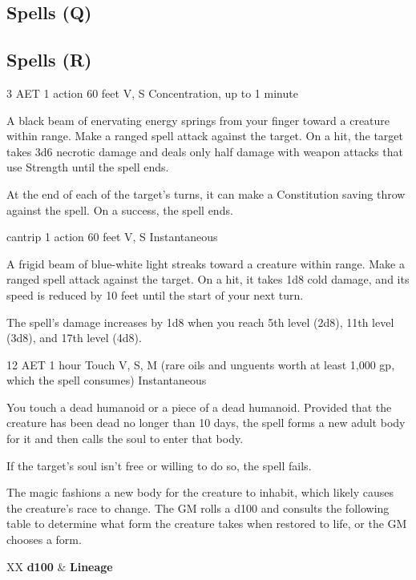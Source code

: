\subsection{Spells (Q)}

\subsection{Spells (R)}

{3 AET}
{1 action}
{60 feet}
{V, S}
{Concentration, up to 1 minute}

A black beam of enervating energy springs from your finger toward a creature within range. Make a ranged spell attack against the target. On a hit, the target takes 3d6 necrotic damage and deals only half damage with weapon attacks that use Strength until the spell ends.

At the end of each of the target's turns, it can make a Constitution saving throw against the spell. On a success, the spell ends.

{cantrip}
{1 action}
{60 feet}
{V, S}
{Instantaneous}

A frigid beam of blue-white light streaks toward a creature within range. Make a ranged spell attack against the target. On a hit, it takes 1d8 cold damage, and its speed is reduced by 10 feet until the start of your next turn.

The spell's damage increases by 1d8 when you reach 5th level (2d8), 11th level (3d8), and 17th level (4d8).

{12 AET}
{1 hour}
{Touch}
{V, S, M (rare oils and unguents worth at least 1,000 gp, which the spell consumes)}
{Instantaneous}

You touch a dead humanoid or a piece of a dead humanoid. Provided that the creature has been dead no longer than 10 days, the spell forms a new adult body for it and then calls the soul to enter that body.

If the target's soul isn't free or willing to do so, the spell fails.

The magic fashions a new body for the creature to inhabit, which likely causes the creature's race to change. The GM rolls a d100 and consults the following table to determine what form the creature takes when restored to life, or the GM chooses a form.

\begin{DndTable}{XX}
\textbf{d100}  & \textbf{Lineage}             \\
\end{DndTable}


